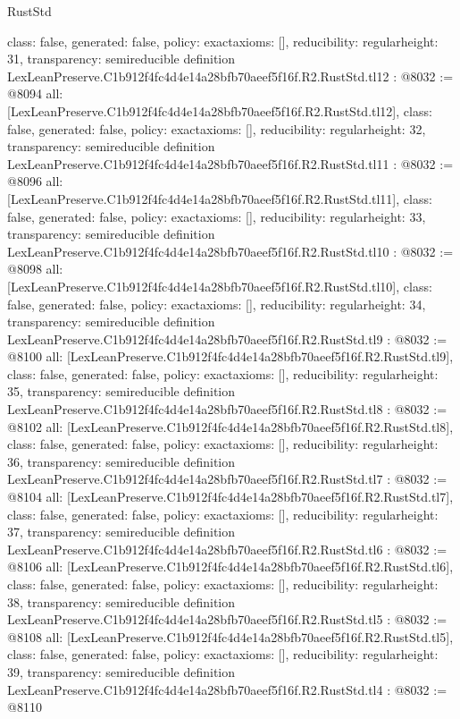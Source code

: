 \begin{lexlean}{RustStd}
\begin{coremodule}
{  class: false,
  generated: false,
  policy: exact{axioms: []},
  reducibility: regular{height: 31},
  transparency: semireducible
}
definition LexLeanPreserve.C1b912f4fc4d4e14a28bfb70aeef5f16f.R2.RustStd.tl12 : @8032 := @8094 {
  all: [LexLeanPreserve.C1b912f4fc4d4e14a28bfb70aeef5f16f.R2.RustStd.tl12],
  class: false,
  generated: false,
  policy: exact{axioms: []},
  reducibility: regular{height: 32},
  transparency: semireducible
}
definition LexLeanPreserve.C1b912f4fc4d4e14a28bfb70aeef5f16f.R2.RustStd.tl11 : @8032 := @8096 {
  all: [LexLeanPreserve.C1b912f4fc4d4e14a28bfb70aeef5f16f.R2.RustStd.tl11],
  class: false,
  generated: false,
  policy: exact{axioms: []},
  reducibility: regular{height: 33},
  transparency: semireducible
}
definition LexLeanPreserve.C1b912f4fc4d4e14a28bfb70aeef5f16f.R2.RustStd.tl10 : @8032 := @8098 {
  all: [LexLeanPreserve.C1b912f4fc4d4e14a28bfb70aeef5f16f.R2.RustStd.tl10],
  class: false,
  generated: false,
  policy: exact{axioms: []},
  reducibility: regular{height: 34},
  transparency: semireducible
}
definition LexLeanPreserve.C1b912f4fc4d4e14a28bfb70aeef5f16f.R2.RustStd.tl9 : @8032 := @8100 {
  all: [LexLeanPreserve.C1b912f4fc4d4e14a28bfb70aeef5f16f.R2.RustStd.tl9],
  class: false,
  generated: false,
  policy: exact{axioms: []},
  reducibility: regular{height: 35},
  transparency: semireducible
}
definition LexLeanPreserve.C1b912f4fc4d4e14a28bfb70aeef5f16f.R2.RustStd.tl8 : @8032 := @8102 {
  all: [LexLeanPreserve.C1b912f4fc4d4e14a28bfb70aeef5f16f.R2.RustStd.tl8],
  class: false,
  generated: false,
  policy: exact{axioms: []},
  reducibility: regular{height: 36},
  transparency: semireducible
}
definition LexLeanPreserve.C1b912f4fc4d4e14a28bfb70aeef5f16f.R2.RustStd.tl7 : @8032 := @8104 {
  all: [LexLeanPreserve.C1b912f4fc4d4e14a28bfb70aeef5f16f.R2.RustStd.tl7],
  class: false,
  generated: false,
  policy: exact{axioms: []},
  reducibility: regular{height: 37},
  transparency: semireducible
}
definition LexLeanPreserve.C1b912f4fc4d4e14a28bfb70aeef5f16f.R2.RustStd.tl6 : @8032 := @8106 {
  all: [LexLeanPreserve.C1b912f4fc4d4e14a28bfb70aeef5f16f.R2.RustStd.tl6],
  class: false,
  generated: false,
  policy: exact{axioms: []},
  reducibility: regular{height: 38},
  transparency: semireducible
}
definition LexLeanPreserve.C1b912f4fc4d4e14a28bfb70aeef5f16f.R2.RustStd.tl5 : @8032 := @8108 {
  all: [LexLeanPreserve.C1b912f4fc4d4e14a28bfb70aeef5f16f.R2.RustStd.tl5],
  class: false,
  generated: false,
  policy: exact{axioms: []},
  reducibility: regular{height: 39},
  transparency: semireducible
}
definition LexLeanPreserve.C1b912f4fc4d4e14a28bfb70aeef5f16f.R2.RustStd.tl4 : @8032 := @8110 {
}
\end{coremodule}
\end{lexlean}
